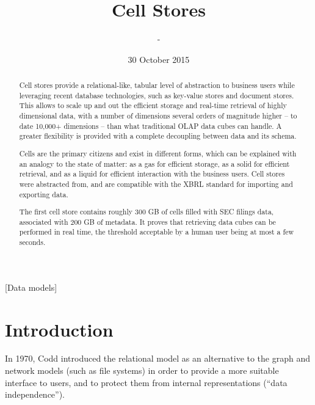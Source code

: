 \documentclass{acm_proc_article-sp}
\begin{document}
\title{Cell Stores}


\author{
\alignauthor
-
}
\date{30 October 2015}
\maketitle

\begin{abstract}
Cell stores provide a relational-like, tabular level of abstraction to business users while leveraging recent database technologies, such as key-value stores and document stores. This allows to scale up and out the efficient storage and real-time retrieval of highly dimensional data, with a number of dimensions several orders of magnitude higher -- to date 10,000+ dimensions -- than what traditional OLAP data cubes can handle. A greater flexibility is provided with a complete decoupling between data and its schema.

Cells are the primary citizens and exist in different forms, which can be explained with an analogy to the state of matter: as a gas for efficient storage, as a solid for efficient retrieval, and as a liquid for efficient interaction with the business users. Cell stores were abstracted from, and are compatible with the XBRL standard for importing and exporting data.

The first cell store contains roughly 300 GB of cells filled with SEC filings data, associated with 200 GB of metadata. It proves that retrieving data cubes can be performed in real time, the threshold acceptable by a human user being at most a few seconds.
\end{abstract}

[Data models]



\section{Introduction}
In 1970, Codd \cite{Codd1970} introduced the relational model as an alternative to the graph and network models (such as file systems) in order to provide a more suitable interface to users, and to protect them from internal representations (``data independence'').
\end{document}
